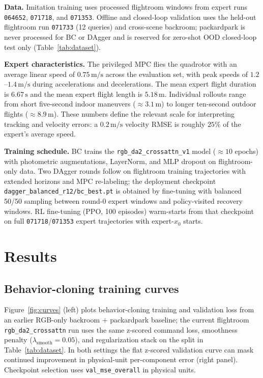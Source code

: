 \documentclass[10pt,twocolumn,letterpaper]{article}
\begin{document}
\textbf{Data.} Imitation training uses processed flightroom windows from expert runs \texttt{064652}, \texttt{071718}, and \texttt{071353}. Offline and closed-loop validation uses the held-out flightroom run \texttt{071733} (12 queries) and cross-scene backroom; packardpark is never processed for BC or DAgger and is reserved for zero-shot OOD closed-loop test only (Table~\ref{tab:dataset}).

\textbf{Expert characteristics.} The privileged MPC flies the quadrotor with an average linear speed of $0.75\,\mathrm{m/s}$ across the evaluation set, with peak speeds of $1.2$--$1.4\,\mathrm{m/s}$ during accelerations and decelerations. The mean expert flight duration is $6.67\,\mathrm{s}$ and the mean expert flight length is $5.18\,\mathrm{m}$. Individual rollouts range from short five-second indoor maneuvers ($\approx 3.1\,\mathrm{m}$) to longer ten-second outdoor flights ($\approx 8.9\,\mathrm{m}$). These numbers define the relevant scale for interpreting tracking and velocity errors: a $0.2\,\mathrm{m/s}$ velocity RMSE is roughly $25\%$ of the expert's average speed.

\textbf{Training schedule.} BC trains the \texttt{rgb\_da2\_crossattn\_v1} model (${\approx}10$ epochs) with photometric augmentations, LayerNorm, and MLP dropout on flightroom-only data. Two DAgger rounds follow on flightroom training trajectories with extended horizons and MPC re-labeling; the deployment checkpoint \texttt{dagger\_balanced\_r12/bc\_best.pt} is obtained by fine-tuning with balanced 50/50 sampling between round-$0$ expert windows and policy-visited recovery windows. RL fine-tuning (PPO, 100 episodes) warm-starts from that checkpoint on full \texttt{071718}/\texttt{071353} expert trajectories with expert-$x_0$ starts.

\section{Results}
\label{sec:results}

\subsection{Behavior-cloning training curves}

Figure~\ref{fig:curves} (left) plots behavior-cloning training and validation loss from an earlier RGB-only backroom $+$ packardpark baseline; the current flightroom \texttt{rgb\_da2\_crossattn} run uses the same z-scored command loss, smoothness penalty ($\lambda_\text{smooth}{=}0.05$), and regularization stack on the split in Table~\ref{tab:dataset}. In both settings the flat z-scored validation curve can mask continued improvement in physical-unit per-component error (right panel). Checkpoint selection uses \texttt{val\_mse\_overall} in physical units.
\end{document}
